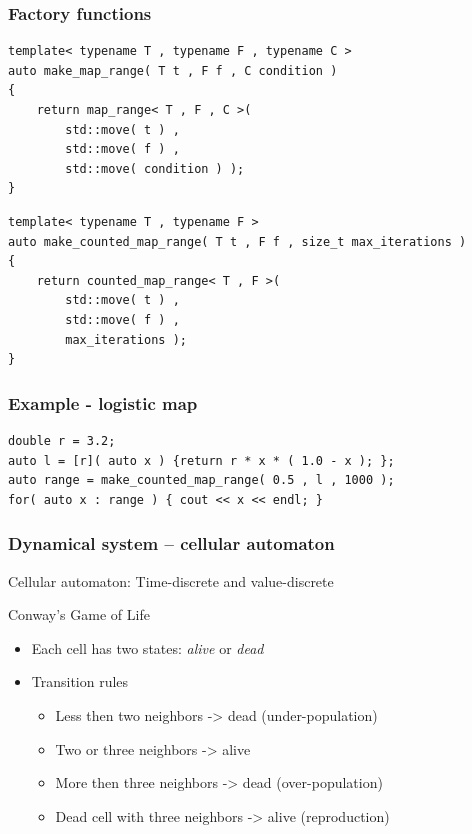 \documentclass{beamer}
\newcommand{\heading}[1]{\frametitle{#1}}
\begin{document}
\begin{frame}[fragile]
 \heading{Factory functions}
 
\begin{lstlisting}[basicstyle=\scriptsize\ttfamily]
template< typename T , typename F , typename C >
auto make_map_range( T t , F f , C condition )
{
    return map_range< T , F , C >(
        std::move( t ) ,
        std::move( f ) ,
        std::move( condition ) );
}
\end{lstlisting}

\begin{lstlisting}[basicstyle=\scriptsize\ttfamily]
template< typename T , typename F >
auto make_counted_map_range( T t , F f , size_t max_iterations )
{
    return counted_map_range< T , F >(
        std::move( t ) ,
        std::move( f ) , 
        max_iterations );
}
\end{lstlisting}

\end{frame}


\begin{frame}[fragile]

  \heading{Example - logistic map}

\begin{lstlisting}[basicstyle=\scriptsize\ttfamily]
double r = 3.2;
auto l = [r]( auto x ) {return r * x * ( 1.0 - x ); };
auto range = make_counted_map_range( 0.5 , l , 1000 );
for( auto x : range ) { cout << x << endl; }
\end{lstlisting}
 
\end{frame}



\begin{frame}[fragile]
 \heading{Dynamical system -- cellular automaton}
 
 Cellular automaton: Time-discrete and value-discrete
 
 \vspace{2ex}
 Conway's Game of Life
 
 \begin{itemize}
  \item Each cell has two states: {\it alive} or {\it dead}
  \item Transition rules
  \begin{itemize}
    \item Less then two neighbors -> dead (under-population)
    \item Two or three neighbors -> alive 
    \item More then three neighbors -> dead (over-population)
    \item Dead cell with three neighbors -> alive (reproduction)
  \end{itemize}
 \end{itemize}

\end{frame}
\end{document}
